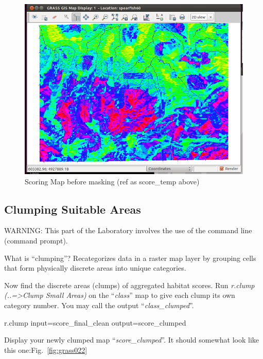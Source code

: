 \begin{figure}[htbp]
   \centering
   \includegraphics[scale=0.35]{grass021.png}
   \caption{Scoring Map before masking (ref as score\_temp above)}
   \label{fig:grass021}
\end{figure}

\subsection{Clumping Suitable Areas}
WARNING: This part of the Laboratory involves the use of the command line (command prompt).

What is ``clumping''?
Recategorizes data in a raster map layer by grouping cells that form physically discrete areas into unique categories.

Now find the discrete areas (clumps) of aggregated habitat scores.
Run \textit{r.clump (..=>Clump Small Areas) }on the ``\textit{class}'' map to give each clump its own category number. You may call the output ``\textit{class\_clumped}''.

\begin{smallverbatim}
r.clump input=score_final_clean
 output=score_clumped
\end{smallverbatim}

Display your newly clumped map ``\textit{score\_clumped}''. It should somewhat look like this one:Fig.~\ref{fig:grass022}

